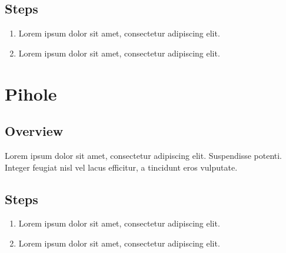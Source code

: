 \documentclass[a4paper,12pt]{article}
\begin{document}
\subsection{Steps}
\begin{enumerate}
    \item Lorem ipsum dolor sit amet, consectetur adipiscing elit.
    \item Lorem ipsum dolor sit amet, consectetur adipiscing elit.
\end{enumerate}

\section{Pihole}

\subsection{Overview}
Lorem ipsum dolor sit amet, consectetur adipiscing elit. Suspendisse potenti. Integer feugiat nisl vel lacus efficitur, a tincidunt eros vulputate.

\subsection{Steps}
\begin{enumerate}
    \item Lorem ipsum dolor sit amet, consectetur adipiscing elit.
    \item Lorem ipsum dolor sit amet, consectetur adipiscing elit.
\end{enumerate}
\end{document}
